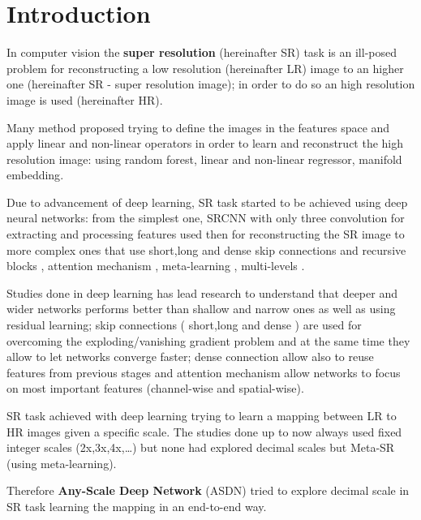 \section{Introduction}
In computer vision the \textbf{super resolution} (hereinafter SR) task is an ill-posed problem for reconstructing a low resolution (hereinafter LR) image to an higher one (hereinafter SR - super resolution image); in order to do so an high resolution image is used (hereinafter HR).

Many method proposed trying to define the images in the features space and apply linear and non-linear operators in order to learn and reconstruct the high resolution image: using random forest, linear and non-linear regressor, manifold embedding\cite{SRneighbporembedding}.

Due to advancement of deep learning, SR task started to be achieved using deep neural networks: from the simplest one, SRCNN\cite{srcnn} with only three convolution for extracting and processing features used then for reconstructing the SR image to more complex ones that use short,long and dense skip connections \cite{RED}\cite{DBDN} and recursive blocks \cite{DRCN}\cite{DRRN}, attention mechanism \cite{RCAN}\cite{CSFM}, meta-learning \cite{MetaSR}, multi-levels \cite{LapSRN}\cite{MSLapSRN}. 

Studies done in deep learning has lead research to understand that deeper and wider networks performs better than shallow and narrow ones as well as using residual learning; skip connections ( short,long and dense ) are used for overcoming the exploding/vanishing gradient problem and at the same time they allow to let networks converge faster; dense connection allow also to reuse features from previous stages and attention mechanism allow networks to focus on most important features (channel-wise and spatial-wise).

SR task achieved with deep learning trying to learn a mapping between LR to HR images given a specific scale.
The studies done up to now always used fixed integer scales (2x,3x,4x,\dots) but none had explored decimal scales but Meta-SR\cite{MetaSR} (using meta-learning).

Therefore \textbf{Any-Scale Deep Network} (ASDN) tried to explore decimal scale in SR task learning the mapping in an end-to-end way.
